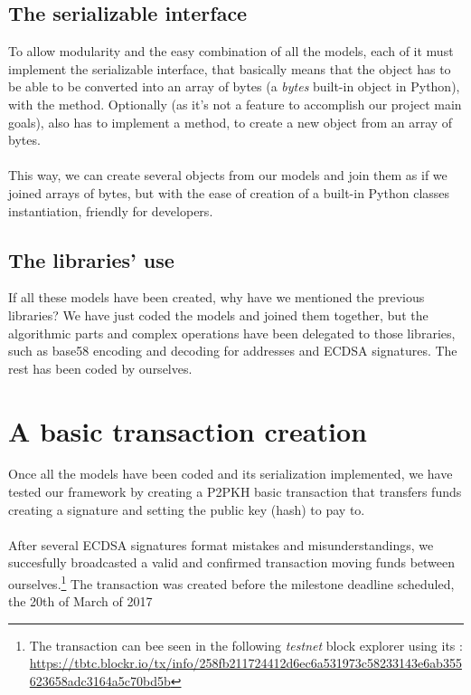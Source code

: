 \subsection{The serializable interface}
To allow modularity and the easy combination of all the models, each of it must implement the serializable interface, that basically means that the object has to be able to be converted into an array of bytes (a \textit{bytes} built-in object in Python), with the  method. Optionally (as it's not a feature to accomplish our project main goals), also has to implement a  method, to create a new object from an array of bytes.\\\\
This way, we can create several objects from our models and join them as if we joined arrays of bytes, but with the ease of creation of a built-in Python classes instantiation, friendly for developers.
\subsection{The libraries' use}
If all these models have been created, why have we mentioned the previous libraries? We have just coded the models and joined them together, but the algorithmic parts and complex operations have been delegated to those libraries, such as base58 encoding and decoding for addresses and ECDSA signatures. The rest has been coded by ourselves.
\section{A basic transaction creation}
Once all the models have been coded and its serialization implemented, we have tested our framework by creating a P2PKH basic transaction that transfers funds creating a signature and setting the public key (hash) to pay to.\\\\ After several ECDSA signatures format mistakes and misunderstandings, we succesfully broadcasted a valid and confirmed transaction moving funds between ourselves.\footnote{The transaction can bee seen in the following \textit{testnet} block explorer using its : \url{https://tbtc.blockr.io/tx/info/258fb211724412d6ec6a531973c58233143e6ab355623658adc3164a5c70bd5b}}
The transaction was created before the milestone deadline scheduled, the 20th of March of 2017